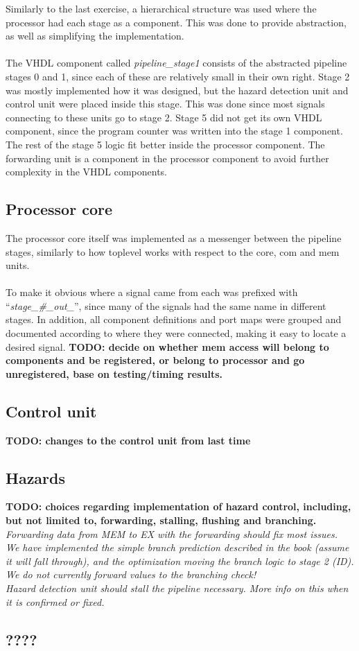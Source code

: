 Similarly to the last exercise, a hierarchical structure was used where the
processor had each stage as a component. This was done to provide abstraction,
as well as simplifying the implementation.
\paragraph*{}
The VHDL component called \emph{pipeline\_stage1} consists of the abstracted
pipeline stages 0 and 1, since each of these are relatively small in their own
right. Stage 2 was mostly implemented how it was designed, but the hazard
detection unit and control unit were placed inside this stage. This was done
since most signals connecting to these units go to stage 2. Stage 5 did not get
its own VHDL component, since the program counter was written into the stage 1
component. The rest of the stage 5 logic fit better inside the processor
component. The forwarding unit is a component in the processor component to
avoid further complexity in the VHDL components.

\subsection{Processor core}
The processor core itself was implemented as a messenger between the pipeline
stages, similarly to how toplevel works with respect to the core, com and mem
units.
\paragraph*{}
To make it obvious where a signal came from each was prefixed with
``\emph{stage\_\#\_out\_}'', since many of the signals had the same name in
different stages. In addition, all component definitions and port maps were
grouped and documented according to where they were connected, making it easy to
locate a desired signal.\newline
\textbf{TODO: decide on whether mem access will belong to components and be registered, or belong to processor and go unregistered, base on testing/timing results.}

\subsection{Control unit}
\textbf{TODO: changes to the control unit from last time}
\subsection{Hazards}
\textbf{TODO: choices regarding implementation of hazard control, including, but not limited to, forwarding, stalling, flushing and branching.}
\emph{Forwarding data from MEM to EX with the forwarding should fix most issues.
\\
We have implemented the simple branch prediction described in the book
(assume it will fall through), and the optimization moving the branch logic to
stage 2 (ID). We do not currently forward values to the branching check!
\\
Hazard detection unit should stall the pipeline necessary. More info on this
when it is confirmed or fixed.}

\subsection{????}